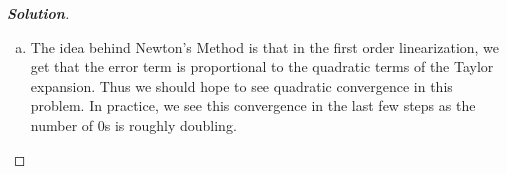 \documentclass[11pt]{article}
\newenvironment{solution}{%
  \begin{proof}[\textbf{Solution}]$ $\par\nobreak\ignorespaces
}{%
  \end{proof}
}
\theoremstyle{definition}
\begin{document}
\begin{solution}
\begin{enumerate}[(a)]
\begin{align*}
    \begin{bmatrix*}1 & -2 & 0 \\ 2 & 0 & 3\end{bmatrix*} \begin{bmatrix*}-1 \\ 2 \\-3 \end{bmatrix*} &= \begin{bmatrix*}1 & -2 & 0 \\ 2 & 0 & 3\end{bmatrix*} \begin{bmatrix*}1 & 2 \\ -2 & 0 \\ 0 & 3\end{bmatrix*}\tilde{x} \\
    \begin{bmatrix*}-5 \\ -11\end{bmatrix*} &= \begin{bmatrix*}5 & 2 \\2 & 13\end{bmatrix*}\tilde{x}
\end{align*}
\item The idea behind Newton's Method is that in the first order linearization, we get that the error term is proportional to the quadratic terms of the Taylor expansion. Thus we should hope to see quadratic convergence in this problem. In practice, we see this convergence in the last few steps as the number of 0s is roughly doubling.
\end{enumerate}
\end{solution}
\end{document}
